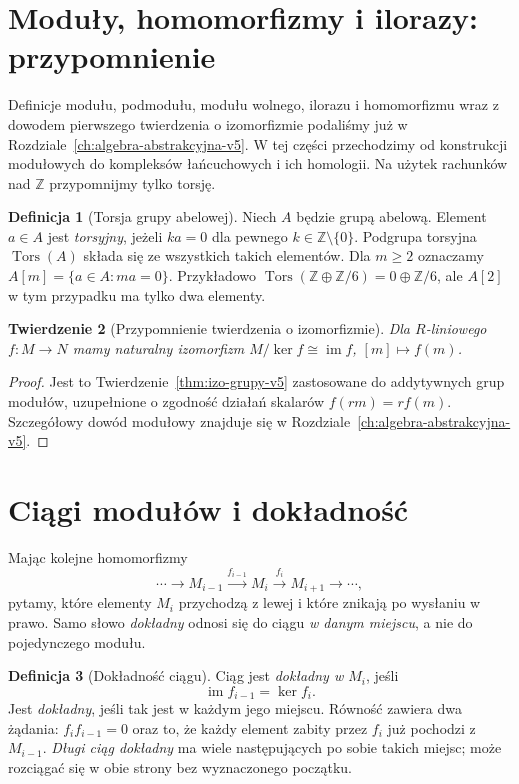 \documentclass[11pt,a4paper,oneside]{report}
\newcommand{\Z}{\mathbb{Z}}
\theoremstyle{plain}
\newtheorem{twierdzenie}{Twierdzenie}[section]
\theoremstyle{definition}
\newtheorem{definicja}[twierdzenie]{Definicja}
\theoremstyle{remark}
\begin{document}
\section{Moduły, homomorfizmy i ilorazy: przypomnienie}
\label{sec:moduly}
Definicje modułu, podmodułu, modułu wolnego, ilorazu i homomorfizmu
wraz z dowodem pierwszego twierdzenia o izomorfizmie podaliśmy już
w Rozdziale~\ref{ch:algebra-abstrakcyjna-v5}. W tej części przechodzimy
od konstrukcji modułowych do kompleksów łańcuchowych i ich homologii.
Na użytek rachunków nad $\Z$ przypomnijmy tylko torsję.

\begin{definicja}[Torsja grupy abelowej]
\label{def:torsja}
Niech $A$ będzie grupą abelową. Element $a\in A$ jest
\emph{torsyjny}, jeżeli $ka=0$ dla pewnego $k\in\Z\setminus\{0\}$.
Podgrupa torsyjna $\operatorname{Tors}(A)$ składa się ze
wszystkich takich elementów. Dla $m\ge2$ oznaczamy
$A[m]=\{a\in A:ma=0\}$.
Przykładowo $\operatorname{Tors}(\Z\oplus\Z/6)=0\oplus\Z/6$,
ale $A[2]$ w tym przypadku ma tylko dwa elementy.
\end{definicja}

\begin{twierdzenie}[Przypomnienie twierdzenia o izomorfizmie]
\label{thm:modul-izomorfizm}
Dla $R$-liniowego $f:M\to N$ mamy naturalny izomorfizm
$M/\ker f\cong\operatorname{im}f$, $[m]\mapsto f(m)$.
\end{twierdzenie}
\begin{proof}
Jest to Twierdzenie~\ref{thm:izo-grupy-v5} zastosowane do
addytywnych grup modułów, uzupełnione o zgodność działań skalarów
$f(rm)=rf(m)$. Szczegółowy dowód modułowy znajduje się
w Rozdziale~\ref{ch:algebra-abstrakcyjna-v5}.
\end{proof}

\section{Ciągi modułów i dokładność}
\label{sec:dokladnosc-modulow}

Mając kolejne homomorfizmy
\[
 \cdots\longrightarrow M_{i-1}
 \xrightarrow{f_{i-1}}M_i
 \xrightarrow{f_i}M_{i+1}
 \longrightarrow\cdots,
\]
pytamy, które elementy $M_i$ przychodzą z lewej
i które znikają po wysłaniu w prawo.
Samo słowo \emph{dokładny} odnosi się do
ciągu \emph{w danym miejscu}, a nie do
pojedynczego modułu.

\begin{definicja}[Dokładność ciągu]
\label{def:ciag-dokladny}
Ciąg jest \emph{dokładny w $M_i$}, jeśli
\[
 \operatorname{im}f_{i-1}=\ker f_i.
\]
Jest \emph{dokładny}, jeśli tak jest
w każdym jego miejscu. Równość zawiera
dwa żądania: $f_i f_{i-1}=0$ oraz to,
że każdy element zabity przez $f_i$
już pochodzi z $M_{i-1}$.
\emph{Długi ciąg dokładny} ma wiele
następujących po sobie takich miejsc;
może rozciągać się w obie strony
bez wyznaczonego początku.
\end{definicja}
\end{document}

